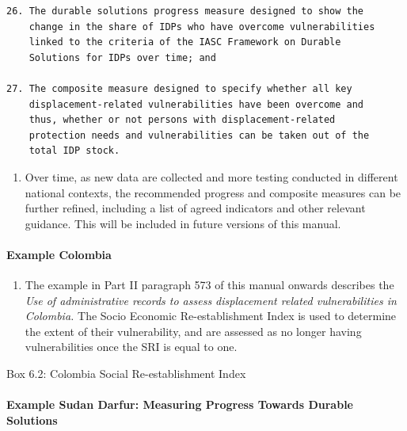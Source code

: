 \documentclass[
]{article}
\providecommand{\tightlist}{%
  \setlength{\itemsep}{0pt}\setlength{\parskip}{0pt}}
\begin{document}
\begin{verbatim}
26. The durable solutions progress measure designed to show the
    change in the share of IDPs who have overcome vulnerabilities
    linked to the criteria of the IASC Framework on Durable
    Solutions for IDPs over time; and

27. The composite measure designed to specify whether all key
    displacement-related vulnerabilities have been overcome and
    thus, whether or not persons with displacement-related
    protection needs and vulnerabilities can be taken out of the
    total IDP stock.
\end{verbatim}

\begin{enumerate}
\def\labelenumi{\arabic{enumi}.}
\setcounter{enumi}{441}
\tightlist
\item
  Over time, as new data are collected and more testing conducted in
  different national contexts, the recommended progress and composite
  measures can be further refined, including a list of agreed
  indicators and other relevant guidance. This will be included in
  future versions of this manual.
\end{enumerate}

\hypertarget{example-colombia}{%
\paragraph{Example Colombia}\label{example-colombia}}

\begin{enumerate}
\def\labelenumi{\arabic{enumi}.}
\setcounter{enumi}{442}
\tightlist
\item
  The example in Part II paragraph 573 of this manual onwards
  describes the \emph{Use of administrative records to assess displacement
  related vulnerabilities in Colombia.} The Socio Economic
  Re-establishment Index is used to determine the extent of their
  vulnerability, and are assessed as no longer having vulnerabilities
  once the SRI is equal to one.
\end{enumerate}

Box 6.2: Colombia Social Re-establishment Index

\hypertarget{example-sudan-darfur-measuring-progress-towards-durable-solutions}{%
\paragraph{Example Sudan Darfur: Measuring Progress Towards Durable Solutions}\label{example-sudan-darfur-measuring-progress-towards-durable-solutions}}
\end{document}
